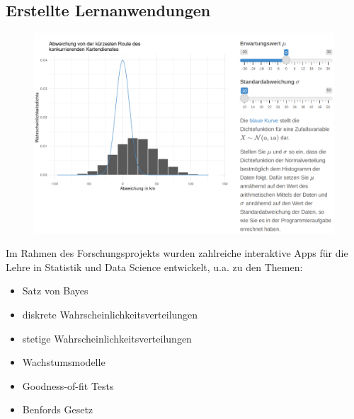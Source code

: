 \documentclass[a0,portrait]{a0poster}
\begin{document}
\begin{multicols}{2}
\section*{Erstellte Lernanwendungen}

\begin{figure}
\includegraphics[width=1.0\linewidth]{wvstetig}
\vspace{-3cm}
\end{figure}

Im Rahmen des Forschungsprojekts wurden zahlreiche interaktive Apps für die Lehre in Statistik und Data Science entwickelt, u.a. zu den Themen:

\begin{itemize}
    \item Satz von Bayes
    \item diskrete Wahrscheinlichkeits\-verteilungen
    \item stetige Wahrscheinlichkeits\-verteilungen
    \item Wachstumsmodelle
    \item Goodness-of-fit Tests
    \item Benfords Gesetz
\end{itemize}






\end{multicols}
\end{document}
